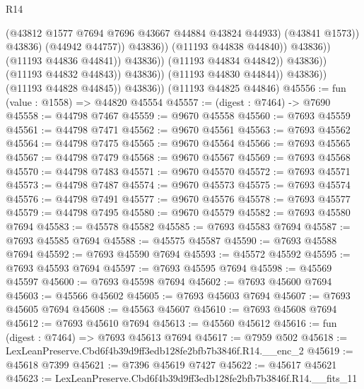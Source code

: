 \begin{lexlean}{R14}
\begin{coremodule}
                                                  (@43812
                                                    @1577
                                                    @7694
                                                    @7696
                                                    @43667
                                                    @44884
                                                    @43824
                                                    @44933)
                                                  (@43841 @1573))
                                                @43836)
                                              (@44942 @44757))
                                            @43836))
                                        (@11193 @44838 @44840))
                                      @43836))
                                  (@11193 @44836 @44841))
                                @43836))
                            (@11193 @44834 @44842))
                          @43836))
                      (@11193 @44832 @44843))
                    @43836))
                (@11193 @44830 @44844))
              @43836))
          (@11193 @44828 @44845))
        @43836))
    (@11193 @44825 @44846)
@45556 := fun (value : @1558) => @44820 @45554
@45557 := (digest : @7464) -> @7690
@45558 := @44798 @7467
@45559 := @9670 @45558
@45560 := @7693 @45559
@45561 := @44798 @7471
@45562 := @9670 @45561
@45563 := @7693 @45562
@45564 := @44798 @7475
@45565 := @9670 @45564
@45566 := @7693 @45565
@45567 := @44798 @7479
@45568 := @9670 @45567
@45569 := @7693 @45568
@45570 := @44798 @7483
@45571 := @9670 @45570
@45572 := @7693 @45571
@45573 := @44798 @7487
@45574 := @9670 @45573
@45575 := @7693 @45574
@45576 := @44798 @7491
@45577 := @9670 @45576
@45578 := @7693 @45577
@45579 := @44798 @7495
@45580 := @9670 @45579
@45582 := @7693 @45580 @7694
@45583 := @45578 @45582
@45585 := @7693 @45583 @7694
@45587 := @7693 @45585 @7694
@45588 := @45575 @45587
@45590 := @7693 @45588 @7694
@45592 := @7693 @45590 @7694
@45593 := @45572 @45592
@45595 := @7693 @45593 @7694
@45597 := @7693 @45595 @7694
@45598 := @45569 @45597
@45600 := @7693 @45598 @7694
@45602 := @7693 @45600 @7694
@45603 := @45566 @45602
@45605 := @7693 @45603 @7694
@45607 := @7693 @45605 @7694
@45608 := @45563 @45607
@45610 := @7693 @45608 @7694
@45612 := @7693 @45610 @7694
@45613 := @45560 @45612
@45616 := fun (digest : @7464) => @7693 @45613 @7694
@45617 := @7959 @502
@45618 := LexLeanPreserve.Cbd6f4b39d9ff3edb128fe2bfb7b3846f.R14.__enc_2
@45619 := @45618 @7399
@45621 := @7396 @45619 @7427
@45622 := @45617 @45621
@45623 := LexLeanPreserve.Cbd6f4b39d9ff3edb128fe2bfb7b3846f.R14.__fits_11

\end{coremodule}
\end{lexlean}
